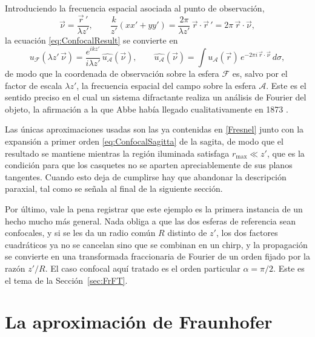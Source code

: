 		Introduciendo la frecuencia espacial asociada al punto de observación,
		\begin{equation}\label{eq:ConfocalFrequency}
			\vec{\nu} = \dfrac{\vec{r}\,'}{\lambda z'}, \qquad \dfrac{k}{z'}\left(xx'+yy'\right) = \dfrac{2\pi}{\lambda z'}\,\vec{r}\cdot\vec{r}\,' = 2\pi\,\vec{r}\cdot\vec{\nu},
		\end{equation}
		la ecuación \eqref{eq:ConfocalResult} se convierte en
		\begin{equation}\label{eq:ConfocalFourier}
			u_{\mathcal{F}}(\lambda z'\,\vec{\nu}) = \dfrac{e^{ikz'}}{i\lambda z'}\,\widehat{u_{\mathcal{A}}}(\vec{\nu}), \qquad \widehat{u_{\mathcal{A}}}(\vec{\nu}) = \int u_{\mathcal{A}}(\vec{r})\,e^{-2\pi i\,\vec{r}\cdot\vec{\nu}}\,d\sigma ,
		\end{equation}
		de modo que la coordenada de observación sobre la esfera $\mathcal{F}$ es, salvo por el factor de escala $\lambda z'$, la frecuencia espacial del campo sobre la esfera $\mathcal{A}$. Este es el sentido preciso en el cual un sistema difractante realiza un análisis de Fourier del objeto, la afirmación a la que Abbe había llegado cualitativamente en 1873 \citep{abbe1873beitrage}.

		Las únicas aproximaciones usadas son las ya contenidas en \eqref{Fresnel} junto con la expansión a primer orden \eqref{eq:ConfocalSagitta} de la sagita, de modo que el resultado se mantiene mientras la región iluminada satisfaga $r_{\max}\ll z'$, que es la condición para que los casquetes no se aparten apreciablemente de sus planos tangentes. Cuando esto deja de cumplirse hay que abandonar la descripción paraxial, tal como se señala al final de la siguiente sección.

		Por último, vale la pena registrar que este ejemplo es la primera instancia de un hecho mucho más general. Nada obliga a que las dos esferas de referencia sean confocales, y si se les da un radio común $R$ distinto de $z'$, los dos factores cuadráticos ya no se cancelan sino que se combinan en un chirp, y la propagación se convierte en una transformada fraccionaria de Fourier de un orden fijado por la razón $z'/R$. El caso confocal aquí tratado es el orden particular $\alpha = \pi/2$. Este es el tema de la Sección~\ref{sec:FrFT}.

\section{La aproximación de Fraunhofer}

